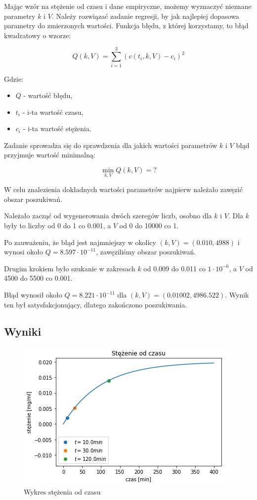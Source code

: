 \documentclass[12pt]{article}
\begin{document}
Mając wzór na stężenie od czasu i dane empiryczne, możemy wyznaczyć nieznane parametry $k$ i $V$.
Należy rozwiązać zadanie regresji, by jak najlepiej dopasowa parametry do zmierzonych wartości.
Funkcja błędu, z której korzystamy, to błąd kwadratowy o wzorze:

\begin{equation}
Q(k, V) = \sum_{i=1}^{3} (c(t_i, k, V) - c_i) ^ 2
\end{equation}

Gdzie:

\begin{itemize}
\item $Q$ - wartość błędu,
\item $t_i$ - i-ta wartość czasu,
\item $c_i$ - i-ta wartość stężenia.
\end{itemize}

Zadanie sprowadza się do sprawdzenia dla jakich wartości parametrów $k$ i $V$ błąd przyjmuje wartość minimalną:

$$
\min_{k, V} Q(k, V) = ?
$$

W celu znalezienia dokładnych wartości parametrów najpierw należało zawęzić obszar poszukiwań.

Należało zacząć od wygenerowania dwóch szeregów liczb, osobno dla $k$ i $V$.
Dla $k$ były to liczby od 0 do 1 co 0.001, a $V$ od 0 do 10000 co 1.

Po zauważeniu, że błąd jest najmniejszy w okolicy $(k, V) = (0.010, 4988)$ i wynosi około $Q = 8.597 \cdot 10^{-11}$, zawęziliśmy obszar poszukiwań.

Drugim krokiem było szukanie w zakresach $k$ od 0.009 do 0.011 co $1 \cdot 10^{-6}$, a $V$ od 4500 do 5500 co 0.001.

Błąd wynosił około $Q = 8.221 \cdot 10^{-11}$ dla $(k, V) = (0.01002, 4986.522)$.
Wynik ten był satysfakcjonujący, dlatego zakończono poszukiwania.

\subsection{Wyniki}

\begin{figure}[H]                                 
\centering                                        
\includegraphics[scale=1.00]{c_t.png}   
\caption{Wykres stężenia od czasu}                      
\label{}                                          
\end{figure}                                      
\end{document}
